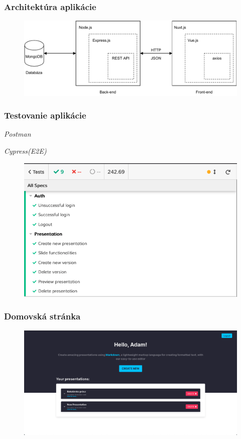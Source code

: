 \documentclass[10pt,xcolor=pdflatex,hyperref={unicode}]{beamer}
\begin{document}
\begin{frame}\frametitle{Architektúra aplikácie}
    \begin{figure}[!hbt]
        \centering
        \includegraphics[scale=0.60]{img/architektura.pdf}
    \end{figure}
\end{frame}

\begin{frame}\frametitle{Testovanie aplikácie}
    \emph{Postman}
    \vspace{\baselineskip}

    \emph{Cypress(E2E)}
    \begin{figure}[!hbt]
        \centering
        \includegraphics[scale=0.3]{img/cypress.png}
    \end{figure}
\end{frame}

\begin{frame}\frametitle{Domovská stránka}
    \begin{figure}[!hbt]
        \centering
        \includegraphics[scale=0.35]{img/domovska_stranka.pdf}
    \end{figure}
\end{frame}
\end{document}
